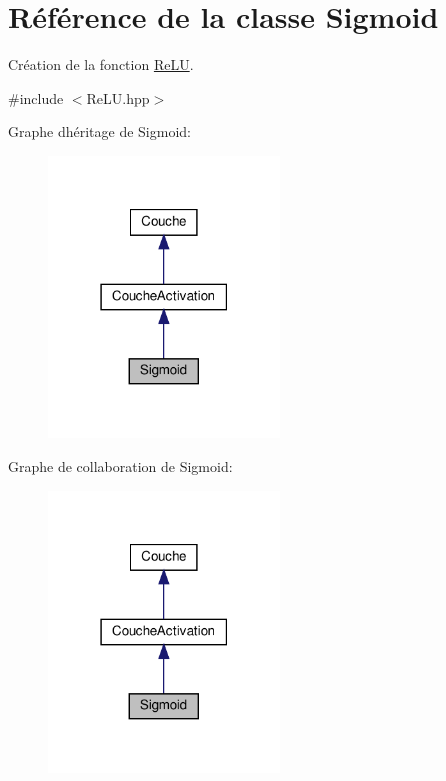 \hypertarget{classSigmoid}{}\section{Référence de la classe Sigmoid}
\label{classSigmoid}


Création de la fonction \hyperlink{classReLU}{Re\+LU}.  




{\ttfamily \#include $<$Re\+L\+U.\+hpp$>$}



Graphe d\textquotesingle{}héritage de Sigmoid\+:
\nopagebreak
\begin{figure}[H]
\begin{center}
\leavevmode
\includegraphics[width=174pt]{classSigmoid__inherit__graph}
\end{center}
\end{figure}


Graphe de collaboration de Sigmoid\+:
\nopagebreak
\begin{figure}[H]
\begin{center}
\leavevmode
\includegraphics[width=174pt]{classSigmoid__coll__graph}
\end{center}
\end{figure}
